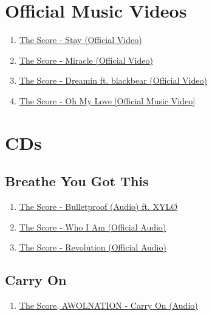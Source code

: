 \documentclass{book}
\numberwithin{equation}{section}
\begin{document}
\section{Official Music Videos}
\begin{enumerate}
    \item \href{https://www.youtube.com/watch?v=1fG2SqZ-R5Q}{The Score - Stay (Official Video)}
    \item \href{https://www.youtube.com/watch?v=XW4vacvZSmA}{The Score - Miracle (Official Video)}
    \item \href{https://www.youtube.com/watch?v=oP5S04q6sVo}{The Score - Dreamin ft. blackbear (Official Video)}
    \item \href{https://www.youtube.com/watch?v=IXTg7owzmYo}{The Score - Oh My Love [Official Music Video]}
\end{enumerate}

\section{CDs}

\subsection{Breathe You Got This}
\begin{enumerate}
    \item \href{https://www.youtube.com/watch?v=BH8pv4Iht8g}{The Score - Bulletproof (Audio) ft. XYLØ}
    \item \href{https://www.youtube.com/watch?v=MwtvktjEuOM}{The Score - Who I Am (Official Audio)}
    \item \href{https://www.youtube.com/watch?v=b99r48grKGI}{The Score - Revolution (Official Audio)}
\end{enumerate}

\subsection{Carry On}
\begin{enumerate}
    \item \href{https://www.youtube.com/watch?v=sPHDxqVi5qA}{The Score, AWOLNATION - Carry On (Audio)}
\end{enumerate}
\end{document}
